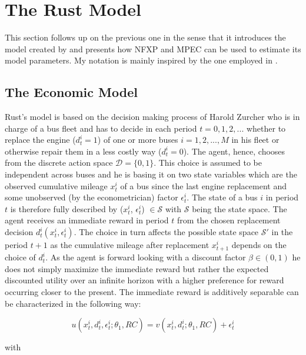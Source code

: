 \section{The Rust Model}
\thispagestyle{plain} %

This section follows up on the previous one in the sense that it introduces the model created by \cite{Rust.1987} and presents how NFXP and MPEC can be used to estimate its model parameters. My notation is mainly inspired by the one employed in \cite{Su.Judd.2012}.

\subsection{The Economic Model}

Rust's model is based on the decision making process of Harold Zurcher who is in charge of a bus fleet and has to decide in each period $t = 0, 1, 2, ...$ whether to replace the engine ($d^i_t=1$) of one or more buses $i = 1, 2, ..., M$ in his fleet or otherwise repair them in a less costly way ($d^i_t=0$). The agent, hence, chooses from the discrete action space $\mathcal{D} = \{0, 1\}$. This choice is assumed to be independent across buses and he is basing it on two state variables which are the observed cumulative mileage $x^i_t$ of a bus since the last engine replacement and some unobserved (by the econometrician) factor $\epsilon^i_t$. The state of a bus $i$ in period $t$ is therefore fully described by ($x^i_t$, $\epsilon^i_t$) $\in \mathcal{S}$ with $\mathcal{S}$ being the state space. The agent receives an immediate reward in period $t$ from the chosen replacement decision $d^i_t(x^i_t, \epsilon^i_t)$. The choice in turn affects the possible state space $\mathcal{S'}$ in the period $t+1$ as the cumulative mileage after replacement $x^i_{t+1}$ depends on the choice of $d^i_t$. As the agent is forward looking with a discount factor $\beta \in (0, 1)$ he does not simply maximize the immediate reward but rather the expected discounted utility over an infinite horizon with a higher preference for reward occurring closer to the present. The immediate reward is additively separable can be characterized in the following way:

\begin{equation}
	u(x^i_t, d^i_t, \epsilon^i_t; \theta_1, RC) = v(x^i_t, d^i_t; \theta_1, RC) + \epsilon^i_t
\end{equation}

with

